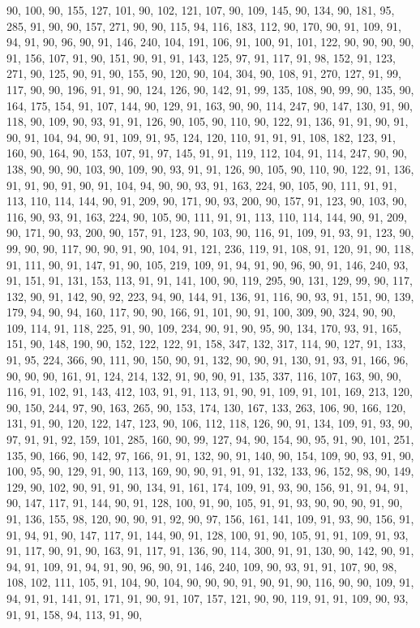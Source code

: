 \begin{sloppypar}
90, 100, 90, 155, 127, 101, 90, 102, 121, 107, 90, 109, 145, 90, 134, 90, 181, 95, 285, 91, 90, 90, 157, 271, 90, 90, 115, 94, 116, 183, 112, 90, 170, 90, 91, 109, 91, 94, 91, 90, 96, 90, 91, 146, 240, 104, 191, 106, 91, 100, 91, 101, 122, 90, 90, 90, 90, 91, 156, 107, 91, 90, 151, 90, 91, 91, 143, 125, 97, 91, 117, 91, 98, 152, 91, 123, 271, 90, 125, 90, 91, 90, 155, 90, 120, 90, 104, 304, 90, 108, 91, 270, 127, 91, 99, 117, 90, 90, 196, 91, 91, 90, 124, 126, 90, 142, 91, 99, 135, 108, 90, 99, 90, 135, 90, 164, 175, 154, 91, 107, 144, 90, 129, 91, 163, 90, 90, 114, 247, 90, 147, 130, 91, 90, 118, 90, 109, 90, 93, 91, 91, 126, 90, 105, 90, 110, 90, 122, 91, 136, 91, 91, 90, 91, 90, 91, 104, 94, 90, 91, 109, 91, 95, 124, 120, 110, 91, 91, 91, 108, 182, 123, 91, 160, 90, 164, 90, 153, 107, 91, 97, 145, 91, 91, 119, 112, 104, 91, 114, 247, 90, 90, 138, 90, 90, 90, 103, 90, 109, 90, 93, 91, 91, 126, 90, 105, 90, 110, 90, 122, 91, 136, 91, 91, 90, 91, 90, 91, 104, 94, 90, 90, 93, 91, 163, 224, 90, 105, 90, 111, 91, 91, 113, 110, 114, 144, 90, 91, 209, 90, 171, 90, 93, 200, 90, 157, 91, 123, 90, 103, 90, 116, 90, 93, 91, 163, 224, 90, 105, 90, 111, 91, 91, 113, 110, 114, 144, 90, 91, 209, 90, 171, 90, 93, 200, 90, 157, 91, 123, 90, 103, 90, 116, 91, 109, 91, 93, 91, 123, 90, 99, 90, 90, 117, 90, 90, 91, 90, 104, 91, 121, 236, 119, 91, 108, 91, 120, 91, 90, 118, 91, 111, 90, 91, 147, 91, 90, 105, 219, 109, 91, 94, 91, 90, 96, 90, 91, 146, 240, 93, 91, 151, 91, 131, 153, 113, 91, 91, 141, 100, 90, 119, 295, 90, 131, 129, 99, 90, 117, 132, 90, 91, 142, 90, 92, 223, 94, 90, 144, 91, 136, 91, 116, 90, 93, 91, 151, 90, 139, 179, 94, 90, 94, 160, 117, 90, 90, 166, 91, 101, 90, 91, 100, 309, 90, 324, 90, 90, 109, 114, 91, 118, 225, 91, 90, 109, 234, 90, 91, 90, 95, 90, 134, 170, 93, 91, 165, 151, 90, 148, 190, 90, 152, 122, 122, 91, 158, 347, 132, 317, 114, 90, 127, 91, 133, 91, 95, 224, 366, 90, 111, 90, 150, 90, 91, 132, 90, 90, 91, 130, 91, 93, 91, 166, 96, 90, 90, 90, 161, 91, 124, 214, 132, 91, 90, 90, 91, 135, 337, 116, 107, 163, 90, 90, 116, 91, 102, 91, 143, 412, 103, 91, 91, 113, 91, 90, 91, 109, 91, 101, 169, 213, 120, 90, 150, 244, 97, 90, 163, 265, 90, 153, 174, 130, 167, 133, 263, 106, 90, 166, 120, 131, 91, 90, 120, 122, 147, 123, 90, 106, 112, 118, 126, 90, 91, 134, 109, 91, 93, 90, 97, 91, 91, 92, 159, 101, 285, 160, 90, 99, 127, 94, 90, 154, 90, 95, 91, 90, 101, 251, 135, 90, 166, 90, 142, 97, 166, 91, 91, 132, 90, 91, 140, 90, 154, 109, 90, 93, 91, 90, 100, 95, 90, 129, 91, 90, 113, 169, 90, 90, 91, 91, 91, 132, 133, 96, 152, 98, 90, 149, 129, 90, 102, 90, 91, 91, 90, 134, 91, 161, 174, 109, 91, 93, 90, 156, 91, 91, 94, 91, 90, 147, 117, 91, 144, 90, 91, 128, 100, 91, 90, 105, 91, 91, 93, 90, 90, 90, 91, 90, 91, 136, 155, 98, 120, 90, 90, 91, 92, 90, 97, 156, 161, 141, 109, 91, 93, 90, 156, 91, 91, 94, 91, 90, 147, 117, 91, 144, 90, 91, 128, 100, 91, 90, 105, 91, 91, 109, 91, 93, 91, 117, 90, 91, 90, 163, 91, 117, 91, 136, 90, 114, 300, 91, 91, 130, 90, 142, 90, 91, 94, 91, 109, 91, 94, 91, 90, 96, 90, 91, 146, 240, 109, 90, 93, 91, 91, 107, 90, 98, 108, 102, 111, 105, 91, 104, 90, 104, 90, 90, 90, 91, 90, 91, 90, 116, 90, 90, 109, 91, 94, 91, 91, 141, 91, 171, 91, 90, 91, 107, 157, 121, 90, 90, 119, 91, 91, 109, 90, 93, 91, 91, 158, 94, 113, 91, 90, 
\end{sloppypar}
